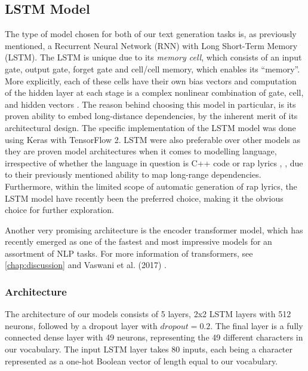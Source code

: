 \subsection{LSTM Model}
\label{sec:lstm-model}
The type of model chosen for both of our text generation tasks is, as previously mentioned, a Recurrent Neural Network (RNN) with Long Short-Term Memory (LSTM). The LSTM is unique due to its \textit{memory cell}, which consists of an input gate, output gate, forget gate and cell/cell memory, which enables its “memory”. More explicitly, each of these cells have their own bias vectors and computation of the hidden layer at each stage is a complex nonlinear combination of gate, cell, and hidden vectors \cite{Malmi_2016}. The reason behind choosing this model in particular, is its proven ability to embed long-distance dependencies, by the inherent merit of its architectural design. The specific implementation of the LSTM model was done using Keras with TensorFlow 2. LSTM were also preferable over other models as they are proven model architectures when it comes to modelling language, irrespective of whether the language in question is C++ code \cite{karpathy_2015} or rap lyrics \cite{potash-etal-2015-ghostwriter}, \cite{PotashPeter2016ECLG}, due to their previously mentioned ability to map long-range dependencies. Furthermore, within the limited scope of automatic generation of rap lyrics, the LSTM model have recently been the preferred choice, making it the obvious choice for further exploration.

Another very promising architecture is the encoder transformer model, which has recently emerged as one of the fastest and most impressive models for an assortment of NLP tasks. For more information of transformers, see \cref{chap:discussion} and Vaswani et al. (2017) \cite{VaswaniAshish2017AIAY}.

\subsubsection{Architecture}
\label{sec:model-architecture}

The architecture of our models consists of 5 layers, 2x2 LSTM layers with 512 neurons, followed by a dropout layer with $dropout=0.2$. The final layer is a fully connected dense layer with 49 neurons, representing the 49 different characters in our vocabulary. The input LSTM layer takes 80 inputs, each being a character represented as a one-hot Boolean vector of length equal to our vocabulary.

